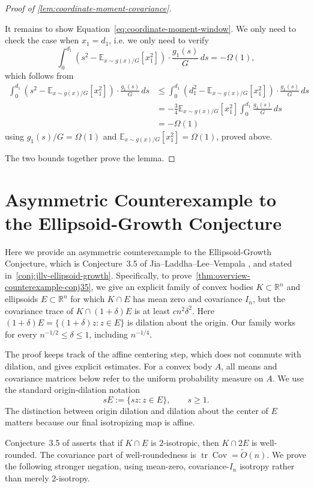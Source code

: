 \documentclass[11pt]{article}
\numberwithin{equation}{section}
\theoremstyle{definition}
\newcommand{\E}[2]{\mathbb{E}_{#1}\left[#2\right]}
\begin{document}
\begin{proof}[Proof of \cref{lem:coordinate-moment-covariance}]
\begin{enumerate}[label=(\roman*)]
It remains to show Equation~\eqref{eq:coordinate-moment-window}.
We only need to check the case when $x_1=d_1$, i.e. we only need to verify
\[
\int_0^{d_1}\left(s^2-\E{x\sim g(x)/G}{x_1^2}\right)\cdot\frac{g_1(s)}{G}\,ds=-\Omega(1),
\]
which follows from
\begin{align*}
\int_0^{d_1}\left(s^2-\E{x\sim g(x)/G}{x_1^2}\right)\cdot\frac{g_1(s)}{G}\,ds
&\le\int_0^{d_1}\left(d_1^2-\E{x\sim g(x)/G}{x_1^2}\right)\cdot\frac{g_1(s)}{G}\,ds\\
&=-\frac34\E{x\sim g(x)/G}{x_1^2}\int_0^{d_1}\frac{g_1(s)}{G}\,ds\\
&=-\Omega(1)
\end{align*}
using $g_1(s)/G=\Omega(1)$ and
$\E{x\sim g(x)/G}{x_1^2}=\Omega(1)$, proved above.
\end{enumerate}
The two bounds together prove the lemma.
\end{proof}
\section{Asymmetric Counterexample to the Ellipsoid-Growth Conjecture}
\label{sec:counter_ellipsoid_growth_asym}

Here we provide an asymmetric counterexample to the Ellipsoid-Growth
Conjecture, which is Conjecture~3.5 of Jia--Laddha--Lee--Vempala
\cite{JLLV26:journal}, and stated in~\cref{conj:jllv-ellipsoid-growth}.
Specifically, to prove~\cref{thm:overview-counterexample-conj35}, we give an
explicit family of convex bodies $K \subset \mathbb{R}^n$ and ellipsoids
$E \subset \mathbb{R}^n$ for which
$K \cap E$ has mean zero and covariance
$I_n$, but the covariance trace of
$K \cap (1+\delta)E$ is at least
$c n^2\delta^2$.
Here $(1+\delta)E=\{(1+\delta)z:z\in E\}$ is dilation about the origin.
Our family works for every $n^{-1/2}\leq\delta\leq1$, including
$n^{-1/4}$.

The proof keeps track of the affine centering step, which does not commute with
dilation, and gives explicit estimates.
For a convex body $A$, all means and covariance matrices below refer to the
uniform probability measure on
$A$.
We use the standard origin-dilation notation
\[
sE := \{sz:z\in E\},
\qquad
s\geq 1.
\]
The distinction between origin dilation and dilation about the center of $E$
matters because our final isotropizing map is affine.

Conjecture~3.5 of \cite{JLLV26:journal} asserts that if $K\cap E$ is
$2$-isotropic, then
$K\cap 2E$ is well-rounded.
The covariance part of well-roundedness is
$\operatorname{tr}\operatorname{Cov}=\widetilde{O}(n)$.
We prove the following stronger negation, using mean-zero, covariance-$I_n$
isotropy rather than merely
$2$-isotropy.
\end{document}

